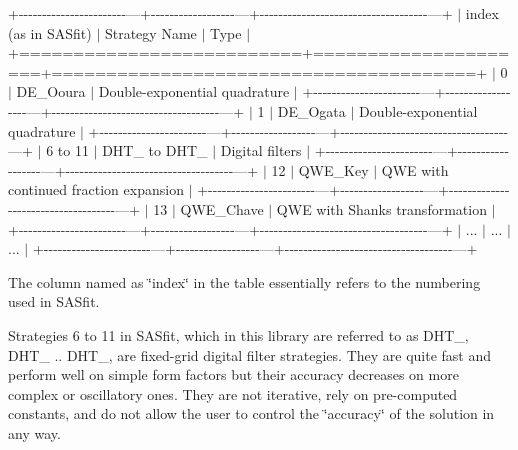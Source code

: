 +-\/-\/-\/-\/-\/-\/-\/-\/-\/-\/-\/-\/-\/-\/-\/-\/-\/-\/-\/-\/-\/-\/-\/---+-\/-\/-\/-\/-\/-\/-\/-\/-\/-\/-\/-\/-\/-\/-\/-\/-\/-\/---+-\/-\/-\/-\/-\/-\/-\/-\/-\/-\/-\/-\/-\/-\/-\/-\/-\/-\/-\/-\/-\/-\/-\/-\/-\/-\/-\/-\/-\/-\/-\/-\/-\/-\/-\/-\/---+ $\vert$ index (as in SASfit) $\vert$ Strategy Name $\vert$ Type $\vert$ +==========================+=====================+=======================================+ $\vert$ 0 $\vert$ DE\+\_\+\+Ooura $\vert$ Double-\/exponential quadrature $\vert$ +-\/-\/-\/-\/-\/-\/-\/-\/-\/-\/-\/-\/-\/-\/-\/-\/-\/-\/-\/-\/-\/-\/-\/---+-\/-\/-\/-\/-\/-\/-\/-\/-\/-\/-\/-\/-\/-\/-\/-\/-\/-\/---+-\/-\/-\/-\/-\/-\/-\/-\/-\/-\/-\/-\/-\/-\/-\/-\/-\/-\/-\/-\/-\/-\/-\/-\/-\/-\/-\/-\/-\/-\/-\/-\/-\/-\/-\/-\/---+ $\vert$ 1 $\vert$ DE\+\_\+\+Ogata $\vert$ Double-\/exponential quadrature $\vert$ +-\/-\/-\/-\/-\/-\/-\/-\/-\/-\/-\/-\/-\/-\/-\/-\/-\/-\/-\/-\/-\/-\/-\/---+-\/-\/-\/-\/-\/-\/-\/-\/-\/-\/-\/-\/-\/-\/-\/-\/-\/-\/---+-\/-\/-\/-\/-\/-\/-\/-\/-\/-\/-\/-\/-\/-\/-\/-\/-\/-\/-\/-\/-\/-\/-\/-\/-\/-\/-\/-\/-\/-\/-\/-\/-\/-\/-\/-\/---+ $\vert$ 6 to 11 $\vert$ DHT\+\_ to DHT\+\_ $\vert$ Digital filters $\vert$ +-\/-\/-\/-\/-\/-\/-\/-\/-\/-\/-\/-\/-\/-\/-\/-\/-\/-\/-\/-\/-\/-\/-\/---+-\/-\/-\/-\/-\/-\/-\/-\/-\/-\/-\/-\/-\/-\/-\/-\/-\/-\/---+-\/-\/-\/-\/-\/-\/-\/-\/-\/-\/-\/-\/-\/-\/-\/-\/-\/-\/-\/-\/-\/-\/-\/-\/-\/-\/-\/-\/-\/-\/-\/-\/-\/-\/-\/-\/---+ $\vert$ 12 $\vert$ QWE\+\_\+\+Key $\vert$ QWE with continued fraction expansion $\vert$ +-\/-\/-\/-\/-\/-\/-\/-\/-\/-\/-\/-\/-\/-\/-\/-\/-\/-\/-\/-\/-\/-\/-\/---+-\/-\/-\/-\/-\/-\/-\/-\/-\/-\/-\/-\/-\/-\/-\/-\/-\/-\/---+-\/-\/-\/-\/-\/-\/-\/-\/-\/-\/-\/-\/-\/-\/-\/-\/-\/-\/-\/-\/-\/-\/-\/-\/-\/-\/-\/-\/-\/-\/-\/-\/-\/-\/-\/-\/---+ $\vert$ 13 $\vert$ QWE\+\_\+\+Chave $\vert$ QWE with Shanks transformation $\vert$ +-\/-\/-\/-\/-\/-\/-\/-\/-\/-\/-\/-\/-\/-\/-\/-\/-\/-\/-\/-\/-\/-\/-\/---+-\/-\/-\/-\/-\/-\/-\/-\/-\/-\/-\/-\/-\/-\/-\/-\/-\/-\/---+-\/-\/-\/-\/-\/-\/-\/-\/-\/-\/-\/-\/-\/-\/-\/-\/-\/-\/-\/-\/-\/-\/-\/-\/-\/-\/-\/-\/-\/-\/-\/-\/-\/-\/-\/-\/---+ $\vert$ ... $\vert$ ... $\vert$ ... $\vert$ +-\/-\/-\/-\/-\/-\/-\/-\/-\/-\/-\/-\/-\/-\/-\/-\/-\/-\/-\/-\/-\/-\/-\/---+-\/-\/-\/-\/-\/-\/-\/-\/-\/-\/-\/-\/-\/-\/-\/-\/-\/-\/---+-\/-\/-\/-\/-\/-\/-\/-\/-\/-\/-\/-\/-\/-\/-\/-\/-\/-\/-\/-\/-\/-\/-\/-\/-\/-\/-\/-\/-\/-\/-\/-\/-\/-\/-\/-\/---+

The column named as \char`\"{}index\char`\"{} in the table essentially refers to the numbering used in SASfit.

Strategies 6 to 11 in SASfit, which in this library are referred to as DHT\+\_, DHT\+\_ .. DHT\+\_, are fixed-\/grid digital filter strategies. They are quite fast and perform well on simple form factors but their accuracy decreases on more complex or oscillatory ones. They are not iterative, rely on pre-\/computed constants, and do not allow the user to control the \char`\"{}accuracy\char`\"{} of the solution in any way.

